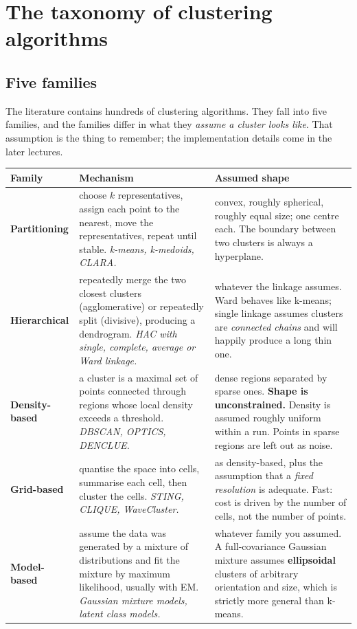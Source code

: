 \documentclass[11pt]{article}
\begin{document}
\notesources{\AMLUnitVIISources}

\section{The taxonomy of clustering algorithms}
\label{sec:tax}

\subsection{Five families}

The literature contains hundreds of clustering algorithms. They fall into five
families, and the families differ in what they \emph{assume a cluster looks
like}. That assumption is the thing to remember; the implementation details
come in the later lectures.

\begin{center}
\small
\begin{tabular}{@{}lp{5.0cm}p{5.0cm}@{}}
  \toprule
  \textbf{Family} & \textbf{Mechanism} & \textbf{Assumed shape} \\
  \midrule
  \textbf{Partitioning} &
    choose $k$ representatives, assign each point to the nearest, move the
    representatives, repeat until stable. \emph{k-means, k-medoids, CLARA.} &
    convex, roughly spherical, roughly equal size; one centre each. The
    boundary between two clusters is always a hyperplane. \\[0.3em]
  \textbf{Hierarchical} &
    repeatedly merge the two closest clusters (agglomerative) or repeatedly
    split (divisive), producing a dendrogram. \emph{HAC with single,
    complete, average or Ward linkage.} &
    whatever the linkage assumes. Ward behaves like k-means; single linkage
    assumes clusters are \emph{connected chains} and will happily produce a
    long thin one. \\[0.3em]
  \textbf{Density-based} &
    a cluster is a maximal set of points connected through regions whose local
    density exceeds a threshold. \emph{DBSCAN, OPTICS, DENCLUE.} &
    dense regions separated by sparse ones. \textbf{Shape is unconstrained.}
    Density is assumed roughly uniform within a run. Points in sparse regions
    are left out as noise. \\[0.3em]
  \textbf{Grid-based} &
    quantise the space into cells, summarise each cell, then cluster the
    cells. \emph{STING, CLIQUE, WaveCluster.} &
    as density-based, plus the assumption that a \emph{fixed resolution} is
    adequate. Fast: cost is driven by the number of cells, not the number of
    points. \\[0.3em]
  \textbf{Model-based} &
    assume the data was generated by a mixture of distributions and fit the
    mixture by maximum likelihood, usually with EM. \emph{Gaussian mixture
    models, latent class models.} &
    whatever family you assumed. A full-covariance Gaussian mixture assumes
    \textbf{ellipsoidal} clusters of arbitrary orientation and size, which is
    strictly more general than k-means. \\
  \bottomrule
\end{tabular}
\end{center}
\end{document}
